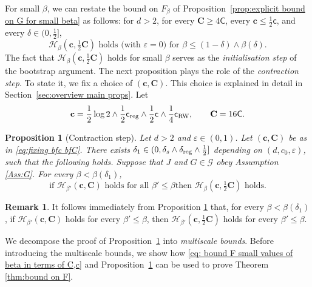 \documentclass[11pt,a4paper]{article}
\numberwithin{equation}{section}
\theoremstyle{plain}
\newtheorem{Prop}[Thm]{Proposition}
\theoremstyle{definition}
\newtheorem{Rem}[Thm]{Remark}
\newcommand\1{\mathds{1}}
\newcommand\bfc{\mathbf{c}}
\newcommand\bfC{\mathbf{C}}
\newcommand\crw{\mathsf{c}_{\textup{RW}}}
\newcommand\CGreen{\mathsf{C}}
\newcommand\cGreen{\mathsf{c}}
\newcommand\creg{\mathsf{c}_{\textup{reg}}}
\begin{document}
For small $\beta$, we can restate the bound on $F_\beta$ of
Proposition~\ref{prop:explicit bound on G for small beta} as follows: for $d>2$, for every $\bfC \ge 4\CGreen$, every $\bfc \le \frac 12 \cGreen$, and every $\delta \in(0, \frac 12]$,
\begin{equation}
\label{eq: bound F small values of beta in terms of C,c}
	\text{$\mathcal H_\beta(\bfc,\tfrac{1}{2}\bfC)$ holds (with $\varepsilon =0$)
    for $\beta\leq (1-\delta)\wedge\beta(\delta)$.}
\end{equation}
The fact that $\mathcal H_\beta(\bfc,\tfrac{1}{2}\bfC)$ holds for small $\beta$ serves as the \emph{initialisation step} of the bootstrap argument.  The next proposition plays the role of the \emph{contraction step}. To state it, we fix a choice of $(\bfc,\bfC)$. This choice is explained in detail in Section~\ref{sec:overview main props}. Let
\begin{equation}\label{eq:fixing bfc bfC}
    \bfc =
    \frac 12 \log 2 \wedge \frac 12 \creg \wedge \frac 12 \cGreen \wedge \frac 14 \crw ,
    \qquad
    \bfC = 16 \CGreen.
\end{equation}

\begin{Prop}[Contraction step]
\label{prop: bootstrap}
Let $d>2$ and $\varepsilon\in (0,1)$. Let $(\bfc,\bfC)$ be as in \eqref{eq:fixing bfc bfC}. There exists
$\delta_1\in (0, \delta_s\wedge \delta_{\textup{reg}}\wedge \tfrac12]$ depending on $(d,c_0,\varepsilon)$, such that the following holds. Suppose that $J$ and $G\in \mathcal G$ obey Assumption \textup{\ref{Ass:G}}.
For every $\beta<\beta(\delta_1)$,
\begin{equation}
\label{eq:bootstrap}
	\text{if $\mathcal H_{\beta'}(\bfc,\bfC)$ holds for all $\beta'\le \beta$
    then $\mathcal H_{\beta}(\bfc,\tfrac{1}{2}\bfC)$ holds.}
\end{equation}
\end{Prop}

\begin{Rem}\label{rem:bootstrap}
It follows immediately from Proposition \ref{prop: bootstrap} that, for every $\beta<\beta(\delta_1)$, if $\mathcal H_{\beta'}(\bfc,\bfC)$ holds for every $\beta'\leq \beta$, then $\mathcal H_{\beta'}(\bfc,\tfrac{1}{2}\bfC)$ holds for every $\beta'\leq \beta$.
\end{Rem}


We decompose the proof of Proposition~\ref{prop: bootstrap} into \emph{multiscale bounds}. Before introducing the multiscale bounds, we show how
\eqref{eq: bound F small values of beta in terms of C,c}
and Proposition~\ref{prop: bootstrap} can be used to prove Theorem \ref{thm:bound on F}.
\end{document}
